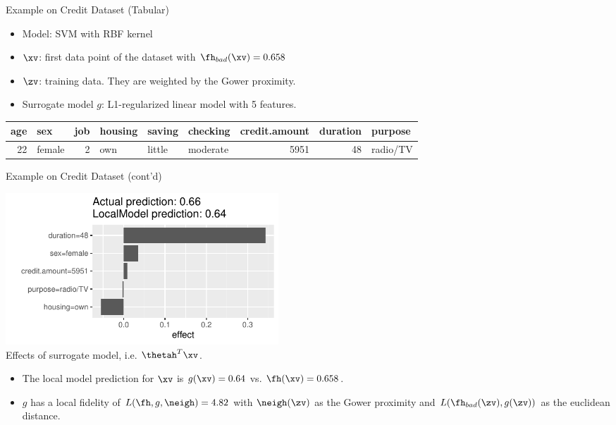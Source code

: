 \documentclass[11pt,compress,t,notes=noshow, aspectratio=169, xcolor=table]{beamer}
\newcommand{\pih}{\fh}
\begin{document}
\begin{frame}[c]{Example on Credit Dataset (Tabular)}
	\begin{itemize}
		\item Model: SVM with RBF kernel
		\item $\xv$: first data point of the dataset with $\fh_{bad}(\xv) = 0.658$
		\item $\zv$: training data. They are weighted by the Gower proximity. 
		\item Surrogate model $g$: L1-regularized linear model with 5 features. 
	\end{itemize}

    \bigskip

	\begin{table}[ht]
		\centering
		\scriptsize
		\begin{tabular}{rlrlllrrl}
			\hline
			age & sex & job & housing & saving & checking & credit.amount & duration & purpose \\ 
			\hline
			 22 & female &   2 & own & little & moderate & 5951 &  48 & radio/TV \\ 
			\hline
		\end{tabular}
	\end{table}

\end{frame}

\begin{frame}[c]{Example on Credit Dataset (cont'd)}


\begin{center}
	\includegraphics[width=0.45\textwidth]{figure/lime_credit.pdf}\\
	{Effects of surrogate model, i.e. $\thetah^T \xv$.}
\end{center}

\begin{itemize}
	\item The local model prediction for $\xv$ is $g(\xv) = 0.64$ vs. $\fh(\xv) = 0.658$. 
	\item $g$ has a local fidelity of $L(\pih, g, \neigh) = 4.82$ with $\neigh(\zv)$ as the Gower proximity and $L(\pih_{bad}(\zv), g(\zv))$ as the euclidean distance. 
\end{itemize}

\end{frame}
	
\end{document}

